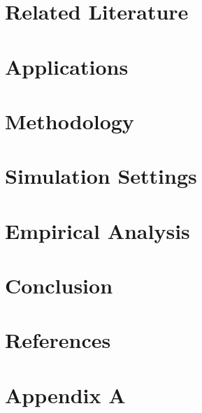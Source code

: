 \documentclass[12pt]{article}
\begin{document}
\section{Related Literature}

\clearpage

\section{Applications}

\clearpage

\section{Methodology}

\clearpage

\section{Simulation Settings}\label{sec:sim}

\clearpage

\section{Empirical Analysis}

\clearpage

\section{Conclusion}

\clearpage


\clearpage
\section*{References}
%
	\printbibliography[heading = none]
\clearpage
\section*{Appendix A}
%

%
%
%
\end{document}
